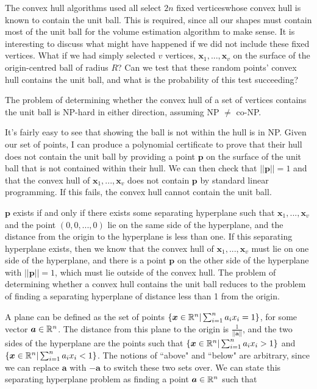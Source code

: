 The convex hull algorithms used all select $2n$ fixed verticeswhose convex hull is known to contain the unit ball. This is required, since all our shapes must contain most of the unit ball for the volume estimation algorithm to make sense. It is interesting to discuss what might have happened if we did not include these fixed vertices. What if we had simply selected $v$ vertices, ${\bm x}_1, ..., {\bm x}_v$ on the surface of the origin-centred ball of radius $R$? Can we test that these random points' convex hull contains the unit ball, and what is the probability of this test succeeding?

\begin{proposition}
The problem of determining whether the convex hull of a set of vertices contains the unit ball is NP-hard in either direction, assuming NP $\neq$ co-NP.
\end{proposition}

It's fairly easy to see that showing the ball is not within the hull is in NP. Given our set of points, I can produce a polynomial certificate to prove that their hull does not contain the unit ball by providing a point $\bm p$ on the surface of the unit ball that is not contained within their hull. We can then check that $||{\bm p}|| = 1$ and that the convex hull of ${\bm x}_1, ..., {\bm x}_v$ does not contain $\bm p$ by standard linear programming. If this fails, the convex hull cannot contain the unit ball.

$\bm p$ exists if and only if there exists some separating hyperplane such that ${\bm x}_1, ..., {\bm x}_v$ and the point $(0,0,...,0)$ lie on the same side of the hyperplane, and the distance from the origin to the hyperplane is less than one. If this separating hyperplane exists, then we know that the convex hull of ${\bm x}_1, ..., {\bm x}_v$ must lie on  one side of the hyperplane, and there is a point $\bm p$ on the other side of the hyperplane with $||{\bm p}|| = 1$, which must lie outside of the convex hull. The problem of determining whether a convex hull contains the unit ball reduces to the problem of finding a separating hyperplane of distance less than 1 from the origin.

A plane can be defined as the set of points $\{ {\bm x} \in \mathbb{R} ^n | \sum^n_{i=1} a_i x_i = 1\}$, for some vector ${\bm a} \in \mathbb{R} ^n$. The distance from this plane to the origin is $\frac{1}{||{\bm a}||}$, and the two sides of the hyperplane are the points such that $\{ {\bm x} \in \mathbb{R} ^n | \sum^n_{i=1} a_i x_i > 1 \}$ and $\{ {\bm x} \in \mathbb{R} ^n | \sum^n_{i=1} a_i x_i < 1 \}$. The notions of ``above" and ``below" are arbitrary, since we can replace $\bm a$ with $- \bm a$ to switch these two sets over. We can state this separating hyperplane problem as finding a point ${\bm a} \in \mathbb{R}^n$ such that

